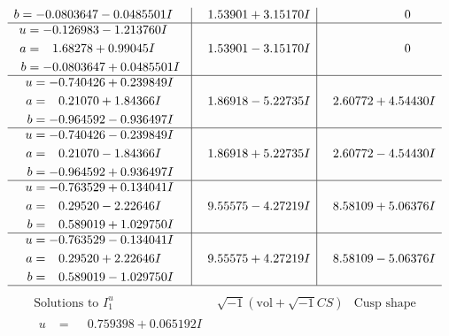\documentclass[1p]{elsarticle_modified}
\theoremstyle{definition}
\newcommand{\I}{\sqrt{-1}}
\begin{document}
$$\begin{array}{c|c|c}
\begin{aligned}
b &= -0.0803647 - 0.0485501 I\end{aligned}
 & \phantom{-}1.53901 + 3.15170 I & \phantom{-0.000000 } 0 \\ \hline\begin{aligned}
u &= -0.126983 - 1.213760 I \\
a &= \phantom{-}1.68278 + 0.99045 I \\
b &= -0.0803647 + 0.0485501 I\end{aligned}
 & \phantom{-}1.53901 - 3.15170 I & \phantom{-0.000000 } 0 \\ \hline\begin{aligned}
u &= -0.740426 + 0.239849 I \\
a &= \phantom{-}0.21070 + 1.84366 I \\
b &= -0.964592 - 0.936497 I\end{aligned}
 & \phantom{-}1.86918 - 5.22735 I & \phantom{-}2.60772 + 4.54430 I \\ \hline\begin{aligned}
u &= -0.740426 - 0.239849 I \\
a &= \phantom{-}0.21070 - 1.84366 I \\
b &= -0.964592 + 0.936497 I\end{aligned}
 & \phantom{-}1.86918 + 5.22735 I & \phantom{-}2.60772 - 4.54430 I \\ \hline\begin{aligned}
u &= -0.763529 + 0.134041 I \\
a &= \phantom{-}0.29520 - 2.22646 I \\
b &= \phantom{-}0.589019 + 1.029750 I\end{aligned}
 & \phantom{-}9.55575 - 4.27219 I & \phantom{-}8.58109 + 5.06376 I \\ \hline\begin{aligned}
u &= -0.763529 - 0.134041 I \\
a &= \phantom{-}0.29520 + 2.22646 I \\
b &= \phantom{-}0.589019 - 1.029750 I\end{aligned}
 & \phantom{-}9.55575 + 4.27219 I & \phantom{-}8.58109 - 5.06376 I\\
 \hline 
 \end{array}$$\newpage$$\begin{array}{c|c|c}  
\text{Solutions to }I^u_{1}& \I (\text{vol} + \sqrt{-1}CS) & \text{Cusp shape}\\
 \hline 
\begin{aligned}
u &= \phantom{-}0.759398 + 0.065192 I \\

\end{aligned}
\end{array}$$
\end{document}
